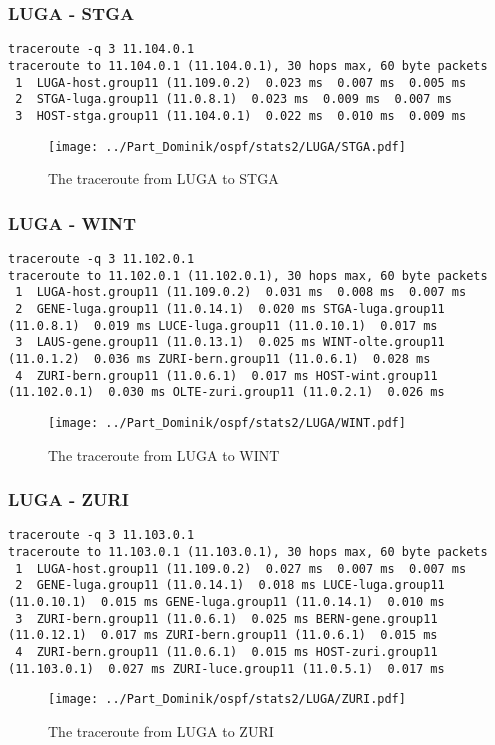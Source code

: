 \subsubsection{LUGA - STGA}
\begin{lstlisting}
traceroute -q 3 11.104.0.1
traceroute to 11.104.0.1 (11.104.0.1), 30 hops max, 60 byte packets
 1  LUGA-host.group11 (11.109.0.2)  0.023 ms  0.007 ms  0.005 ms
 2  STGA-luga.group11 (11.0.8.1)  0.023 ms  0.009 ms  0.007 ms
 3  HOST-stga.group11 (11.104.0.1)  0.022 ms  0.010 ms  0.009 ms
\end{lstlisting}
\begin{figure}[H]
\centering
\texttt{[image: ../Part\_Dominik/ospf/stats2/LUGA/STGA.pdf]}
\caption{The traceroute from LUGA to STGA}
\end{figure}
\clearpage
\subsubsection{LUGA - WINT}
\begin{lstlisting}
traceroute -q 3 11.102.0.1
traceroute to 11.102.0.1 (11.102.0.1), 30 hops max, 60 byte packets
 1  LUGA-host.group11 (11.109.0.2)  0.031 ms  0.008 ms  0.007 ms
 2  GENE-luga.group11 (11.0.14.1)  0.020 ms STGA-luga.group11 (11.0.8.1)  0.019 ms LUCE-luga.group11 (11.0.10.1)  0.017 ms
 3  LAUS-gene.group11 (11.0.13.1)  0.025 ms WINT-olte.group11 (11.0.1.2)  0.036 ms ZURI-bern.group11 (11.0.6.1)  0.028 ms
 4  ZURI-bern.group11 (11.0.6.1)  0.017 ms HOST-wint.group11 (11.102.0.1)  0.030 ms OLTE-zuri.group11 (11.0.2.1)  0.026 ms
\end{lstlisting}
\begin{figure}[H]
\centering
\texttt{[image: ../Part\_Dominik/ospf/stats2/LUGA/WINT.pdf]}
\caption{The traceroute from LUGA to WINT}
\end{figure}
\clearpage
\subsubsection{LUGA - ZURI}
\begin{lstlisting}
traceroute -q 3 11.103.0.1
traceroute to 11.103.0.1 (11.103.0.1), 30 hops max, 60 byte packets
 1  LUGA-host.group11 (11.109.0.2)  0.027 ms  0.007 ms  0.007 ms
 2  GENE-luga.group11 (11.0.14.1)  0.018 ms LUCE-luga.group11 (11.0.10.1)  0.015 ms GENE-luga.group11 (11.0.14.1)  0.010 ms
 3  ZURI-bern.group11 (11.0.6.1)  0.025 ms BERN-gene.group11 (11.0.12.1)  0.017 ms ZURI-bern.group11 (11.0.6.1)  0.015 ms
 4  ZURI-bern.group11 (11.0.6.1)  0.015 ms HOST-zuri.group11 (11.103.0.1)  0.027 ms ZURI-luce.group11 (11.0.5.1)  0.017 ms
\end{lstlisting}
\begin{figure}[H]
\centering
\texttt{[image: ../Part\_Dominik/ospf/stats2/LUGA/ZURI.pdf]}
\caption{The traceroute from LUGA to ZURI}
\end{figure}
\clearpage
